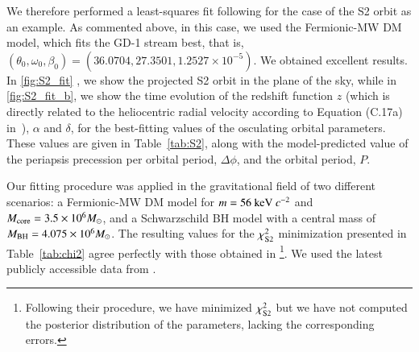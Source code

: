\documentclass[twocolumn]{aa}
\begin{document}
We therefore performed a least-squares fit following \cite{2020A&A...641A..34B} for the case of the S2 orbit as an example. As commented above, in this case, we used the Fermionic-MW DM model, which fits the GD-1 stream best, that is, $(\theta_0, \omega_0, \beta_0)= (36.0704, 27.3501, 1.2527\times10^{-5})$. We obtained excellent results. In \cref{fig:S2_fit} , we show the projected S2 orbit in the plane of the sky, while in \cref{fig:S2_fit_b}, we show the time evolution of the redshift function $z$ (which is directly related to the heliocentric radial velocity according to Equation (C.17a) in~\citealp{2020A&A...641A..34B}), $\alpha$ and $\delta$, for the best-fitting values of the osculating orbital parameters. These values are given in Table~\ref{tab:S2}, along with the model-predicted value of the periapsis precession per orbital period, $\Delta \phi$, and the orbital period, $P$.

Our fitting procedure was applied in the gravitational field of two different scenarios: a Fermionic-MW DM model for $m=56~{\rm keV}~c^{-2}$ and $M_{\rm{core}}=3.5\times 10^6 M_\odot$, and a Schwarzschild BH model with a central mass of $M_{\rm BH}=4.075\times 10^6 M_\odot$.
The resulting values for the $\chi^2_{\rm{S2}}$ minimization presented in Table~\ref{tab:chi2} agree perfectly with those obtained in \cite{2020A&A...641A..34B}\footnote{Following their procedure, we have minimized $\chi^2_{\rm{S2}}$ but we have not computed the posterior distribution of the parameters, lacking the corresponding errors.}.
We used the latest publicly accessible data from \cite{2019Sci...365..664D}.
\end{document}
